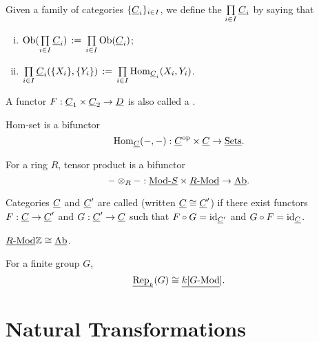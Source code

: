 \begin{definition*}
	Given a family of categories \( \{\C_i\}_{i \in I} \), we define the  \( \prod\limits_{i \in I} \C_i \) by saying that
	\begin{enumerate}[(i)]
		\item \( \Ob(\prod\limits_{i \in I} \C_i) \,:=\, \prod\limits_{i \in I} \Ob(\C_i) \);
		\item \( \prod\limits_{i \in I} \C_i(\{X_i\}, \{Y_i\}) \,:=\, \prod\limits_{i \in I} \Hom_{\C_i}(X_i, Y_i) \).
	\end{enumerate}
\end{definition*}

\begin{definition*}
	A functor \( F: \C_1 \times \C_2 \to \D \) is also called a .
\end{definition*}

\begin{examples*}
	\item Hom-set is a bifunctor
		\[
			\Hom_{\C}(-, -): \C^\op \times \C \to \ctSet.
		\]
	\item For a ring \( R \), tensor product is a bifunctor
		\[
			- \otimes_R -: \ctModR \times \ctRMod \to \ctAb.
		\]
\end{examples*}

\begin{definition*}
	Categories \( \C \) and \( \C' \) are called  (written \( \C \cong \C' \)) if there exist functors \( F: \C \to \C' \) and \( G: \C' \to \C \) such that \( F \circ G = \id_{\C'} \) and \( G \circ F = \id_{\C} \).
\end{definition*}

\begin{examples*}
	\item \( \ctRMod{\bb{Z}} \cong \ctAb \).
	\item For a finite group \( G \),
		\[
			\ctRep_k(G) \cong \ctRMod[k[G]].
		\]
\end{examples*}

\section{Natural Transformations}

